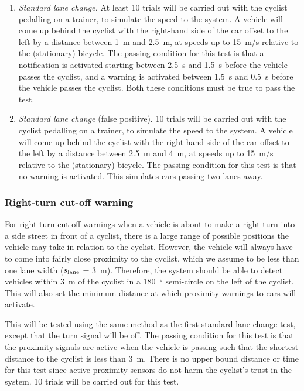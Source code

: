 \documentclass[journal]{IEEEtran}
\begin{document}
\begin{enumerate}
    \item \textit{Standard lane change.} At least 10 trials will be carried out with the cyclist pedalling on a trainer, to simulate the speed to the system. A vehicle will come up behind the cyclist with the right-hand side of the car offset to the left by a distance between \SI{1}{\meter} and \SI{2.5}{\meter}, at speeds up to \SI{15}{\meter/\s} relative to the (stationary) bicycle. The passing condition for this test is that a notification is activated starting between \SI{2.5}{\s} and \SI{1.5}{\s} before the vehicle passes the cyclist, and a warning is activated between \SI{1.5}{\s} and \SI{0.5}{\s} before the vehicle passes the cyclist. Both these conditions must be true to pass the test.
    
    \item \textit{Standard lane change} (false positive). 10 trials will be carried out with the cyclist pedalling on a trainer, to simulate the speed to the system. A vehicle will come up behind the cyclist with the right-hand side of the car offset to the left by a distance between \SI{2.5}{\meter} and \SI{4}{\meter}, at speeds up to \SI{15}{\meter/\s} relative to the (stationary) bicycle. The passing condition for this test is that no warning is activated. This simulates cars passing two lanes away.
\end{enumerate}

\subsubsection{Right-turn cut-off warning}
\label{specs:cutoff}
For right-turn cut-off warnings when a vehicle is about to make a right turn into a side street in front of a cyclist, there is a large range of possible positions the vehicle may take in relation to the cyclist. However, the vehicle will always have to come into fairly close proximity to the cyclist, which we assume to be less than one lane width ($s_\text{lane}$ = \SI{3}{\meter}). Therefore, the system should be able to detect vehicles within \SI{3}{\meter} of the cyclist in a \SI{180}{\degree} semi-circle on the left of the cyclist. This will also set the minimum distance at which proximity warnings to cars will activate.

This will be tested using the same method as the first standard lane change test, except that the turn signal will be off. The passing condition for this test is that the proximity signals are active when the vehicle is passing such that the shortest distance to the cyclist is less than \SI{3}{\meter}. There is no upper bound distance or time for this test since active proximity sensors do not harm the cyclist's trust in the system. 10 trials will be carried out for this test.
\end{document}

